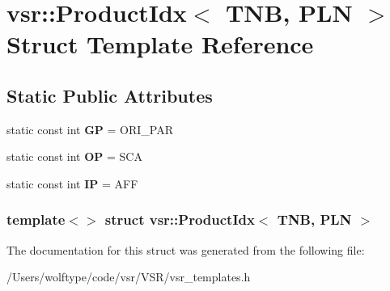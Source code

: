 \hypertarget{structvsr_1_1_product_idx_3_01_t_n_b_00_01_p_l_n_01_4}{\section{vsr\-:\-:Product\-Idx$<$ T\-N\-B, P\-L\-N $>$ Struct Template Reference}
\label{structvsr_1_1_product_idx_3_01_t_n_b_00_01_p_l_n_01_4}
}
\subsection*{Static Public Attributes}
\begin{DoxyCompactItemize}
\item 
\hypertarget{structvsr_1_1_product_idx_3_01_t_n_b_00_01_p_l_n_01_4_ab6c33224ec9785902a36ca1a7e04bb0a}{static const int {\bfseries G\-P} = O\-R\-I\-\_\-\-P\-A\-R}\label{structvsr_1_1_product_idx_3_01_t_n_b_00_01_p_l_n_01_4_ab6c33224ec9785902a36ca1a7e04bb0a}

\item 
\hypertarget{structvsr_1_1_product_idx_3_01_t_n_b_00_01_p_l_n_01_4_a174227bc195f56fb98f77695f39ea509}{static const int {\bfseries O\-P} = S\-C\-A}\label{structvsr_1_1_product_idx_3_01_t_n_b_00_01_p_l_n_01_4_a174227bc195f56fb98f77695f39ea509}

\item 
\hypertarget{structvsr_1_1_product_idx_3_01_t_n_b_00_01_p_l_n_01_4_a660693cfdcf4e6c5029cc1a225ae746f}{static const int {\bfseries I\-P} = A\-F\-F}\label{structvsr_1_1_product_idx_3_01_t_n_b_00_01_p_l_n_01_4_a660693cfdcf4e6c5029cc1a225ae746f}

\end{DoxyCompactItemize}
\subsubsection*{template$<$$>$ struct vsr\-::\-Product\-Idx$<$ T\-N\-B, P\-L\-N $>$}



The documentation for this struct was generated from the following file\-:\begin{DoxyCompactItemize}
\item 
/\-Users/wolftype/code/vsr/\-V\-S\-R/vsr\-\_\-templates.\-h\end{DoxyCompactItemize}
